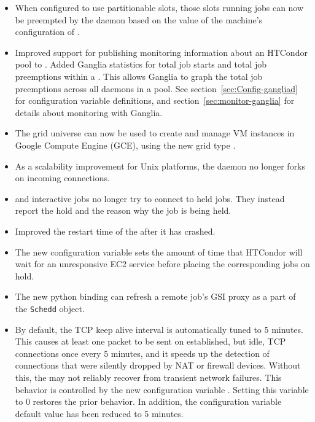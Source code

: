 \begin{itemize}

\item When configured to use partitionable slots,
those slots running jobs can now be preempted by the 
 daemon based on the value of 
the machine's configuration of .

\item Improved support for publishing monitoring information about an
HTCondor pool to .
Added Ganglia statistics for total job starts and total job preemptions
within a .
This allows Ganglia to graph the total job preemptions
across all  daemons in a pool.
See section~\ref{sec:Config-gangliad} for configuration variable definitions,
and section~\ref{sec:monitor-ganglia} for details about monitoring
with Ganglia.

\item The grid universe can now be used to create and manage VM instances
in Google Compute Engine (GCE), using the new grid type .

\item As a scalability improvement for Unix platforms, 
the  daemon no longer forks on incoming connections.

\item {} and interactive jobs no longer try to 
connect to held jobs.
They instead report the hold and the reason why the job is being held.

\item Improved the restart time of the  after it has crashed.

\item The new configuration variable  sets
the amount of time that HTCondor will wait for an unresponsive EC2 service 
before placing the corresponding jobs on hold.

\item The new python binding 
can refresh a remote job's GSI proxy as a part of the \texttt{Schedd} object.

\item By default, 
the TCP keep alive interval is automatically tuned to 5 minutes.  
This causes at least one packet to be sent on established,
but idle, TCP connections once every 5 minutes, 
and it speeds up the detection of connections that were silently dropped 
by NAT or firewall devices.
Without this, 
the  may not reliably recover from transient network failures.
This behavior is controlled by the new configuration variable
.
Setting this variable to 0 restores the prior behavior.
In addition, the configuration variable  
default value has been reduced to 5 minutes.


\end{itemize}
